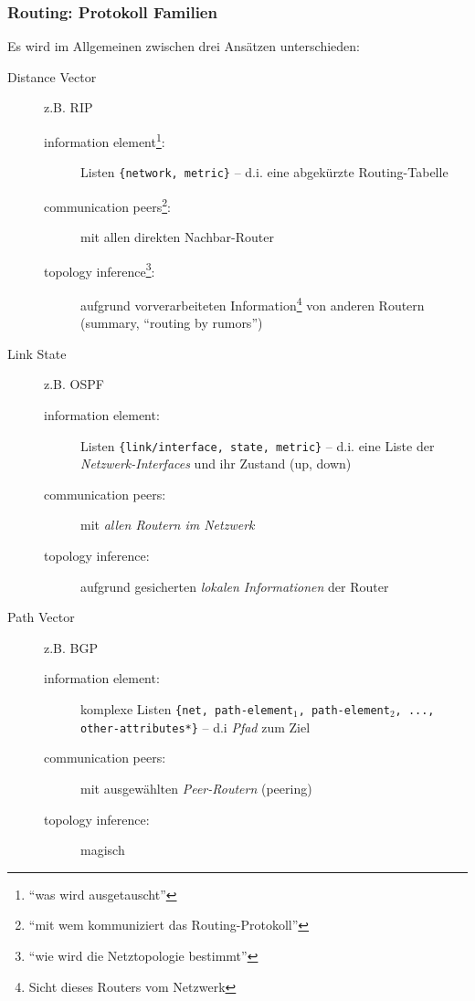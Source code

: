 \documentclass[ignorenonframetext]{beamer}
\begin{document}
\begin{frame}
\frametitle{Routing: Protokoll Familien}
Es wird im Allgemeinen zwischen drei Ans\"atzen unterschieden:
\begin{description}
	\item[Distance Vector] z.B. RIP{ \begin{tiny}
	  \begin{description}
	  	  \item[]
	    \item[information element\footnote{``was wird ausgetauscht''}:] Listen \texttt{\{network, metric\}} -- d.i. eine abgek\"urzte Routing-Tabelle
	    \item[communication peers\footnote{``mit wem kommuniziert das Routing-Protokoll''}:] mit allen direkten Nachbar-Router
			\item[topology inference\footnote{``wie wird die Netztopologie bestimmt''}:] aufgrund vorverarbeiteten Information\footnote{Sicht dieses Routers vom Netzwerk} von anderen Routern (summary, ``routing by rumors'')
	  \end{description}
	  \end{tiny}}
	\item[Link State] z.B. OSPF{ \begin{tiny}
	  \begin{description}
	  	  \item[]
	    \item[information element:] Listen \texttt{\{link/interface, state, metric\}} -- d.i. eine Liste der {\em Netzwerk-Interfaces} und ihr Zustand (up, down)
	    \item[communication peers:] mit {\em allen Routern im Netzwerk}
			\item[topology inference:] aufgrund gesicherten {\em lokalen Informationen} der Router
	  \end{description}
	  \end{tiny}}
	\item[Path Vector] z.B. BGP{ \begin{tiny}
	  \begin{description}
	  	  \item[]
	    \item[information element:] komplexe Listen \texttt{\{net, path-element$_{1}$, path-element$_{2}$, ..., other-attributes*\}} -- d.i {\em Pfad} zum Ziel
	    \item[communication peers:] mit ausgew\"ahlten {\em Peer-Routern} (peering)
			\item[topology inference:] magisch
	  \end{description}
	  \end{tiny}}
\end{description}
\end{frame}
\end{document}
